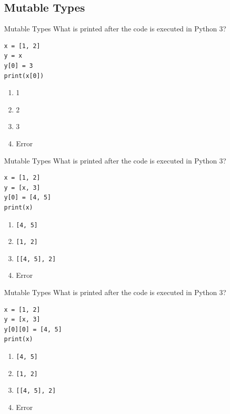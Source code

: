 \documentclass[9pt]{beamer}
\begin{document}
\subsection{Mutable Types}
\begin{frame}[fragile]{Mutable Types}
  What is printed after the code is executed in Python 3?

  \begin{lstlisting}
x = [1, 2]
y = x
y[0] = 3
print(x[0])
  \end{lstlisting}

  \begin{enumerate}
    \item
      1
    \item
      2
    \item
      \alert<2>{3}
    \item
      Error
  \end{enumerate}
\end{frame}

\begin{frame}[fragile]{Mutable Types}
  What is printed after the code is executed in Python 3?

  \begin{lstlisting}
x = [1, 2]
y = [x, 3]
y[0] = [4, 5]
print(x)
  \end{lstlisting}

  \begin{enumerate}
    \item
      {\tt [4, 5]}
    \item
      \alert<2>{\tt [1, 2]}
    \item
      {\tt [[4, 5], 2]}
    \item
      Error
  \end{enumerate}
\end{frame}

\begin{frame}[fragile]{Mutable Types}
  What is printed after the code is executed in Python 3?

  \begin{lstlisting}
x = [1, 2]
y = [x, 3]
y[0][0] = [4, 5]
print(x)
  \end{lstlisting}

  \begin{enumerate}
    \item
      {\tt [4, 5]}
    \item
      {\tt [1, 2]}
    \item
      \alert<2>{\tt [[4, 5], 2]}
    \item
      Error
  \end{enumerate}
\end{frame}
\end{document}
